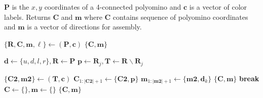 \begin{algorithm}
\newcommand\algotext[1]{\end{algorithmic}#1\begin{algorithmic}[1]}
\caption{($\mathbf{P},\mathbf{c})$   \label{alg:Decompose}}
$\mathbf{P}$ is the $x,y$ coordinates of a 4-connected polyomino and $ \mathbf{c} $ is a vector of color labels.
Returns $ \mathbf{C} $ and $\mathbf{m}$ where $ \mathbf{C} $ contains sequence of polyomino coordinates and $\mathbf{m}$ is a vector of directions for assembly.
\begin{algorithmic}[1]

\State $ \{ \mathbf{R},\mathbf{C}, \mathbf{m}, \ell \} \gets ${}$(\mathbf{P},\mathbf{c})$
\State \Return $\{ \mathbf{C},\mathbf{m} \}$ 
\EndIf

\State $\mathbf{d} \gets\{u,d,l,r\}, \mathbf{R} \gets \mathbf{P}$
\State $\mathbf{p} \gets \mathbf{R}_j,  \mathbf{T} \gets  \mathbf{R}  \backslash   \mathbf{R}_j$

\State $\{\mathbf{C2},\mathbf{m2} \}\gets ${}$(\mathbf{T},\mathbf{c})$
\State $\mathbf{C}_{1:|\mathbf{C2}|+1} \gets \{\mathbf{C2},\mathbf{p}\}$
\State $ \mathbf{m}_{1:|\mathbf{m2}|+1} \gets \{\mathbf{m2},\mathbf{d}_k\}$
\State \Return $\{ \mathbf{C}, \mathbf{m} \}$ 
\EndIf
\State \textbf{break}
\EndIf
\EndFor
\EndFor
\State $\mathbf{C} \gets \{\}, \mathbf{m} \gets \{\}$
\State \Return $\{ \mathbf{C}, \mathbf{m} \}$ 
\end{algorithmic}
\end{algorithm} 



